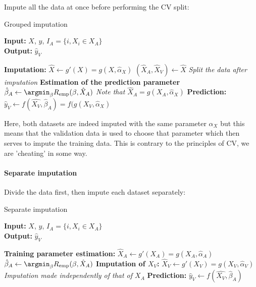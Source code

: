 Impute all the data at once before performing the CV split:
\begin{algorithm}[H]
	\caption{Grouped imputation}
	\hspace*{\algorithmicindent} \textbf{Input:} $X$, $y$, $I_A=\{i, X_i \in X_A\}$ \\
 	\hspace*{\algorithmicindent} \textbf{Output:} $\hat{y}_V$
	\begin{algorithmic}[1]
		\State \textbf{Imputation:}
		\Indstate $\hat{X} \leftarrow g'(X) = g(X, \hat{\alpha}_X)$ 
		\Indstate $(\hat{X}_A, \hat{X}_V) \leftarrow \hat{X}$ \Comment \emph{Split the data after imputation}
		\State \textbf{Estimation of the prediction parameter}
		\Indstate $\hat{\beta}_A \leftarrow \argmin_{\beta} R_{\text{emp}}(\beta,\hat{X}_A)$ \Comment \emph{Note that $\hat{X}_A = g(X_A, \hat{\alpha}_X)$}
		\State \textbf{Prediction:}
		\Indstate $\hat{y}_V \leftarrow f(\hat{X_V}, \hat{\beta}_A) = f(g(X_V, \hat{\alpha}_X)$
	\end{algorithmic}
\end{algorithm}

Here, both datasets are indeed imputed with the same parameter $\alpha_X$ but this means that the validation data is used to choose that parameter which then serves to impute the training data. This is contrary to the principles of CV, we are 'cheating' in some way.

\paragraph{Separate imputation}
Divide the data first, then impute each dataset separately:
\begin{algorithm}[H]
	\caption{Separate imputation}
	\hspace*{\algorithmicindent} \textbf{Input:} $X$, $y$, $I_A=\{i, X_i \in X_A\}$ \\
 	\hspace*{\algorithmicindent} \textbf{Output:} $\hat{y}_V$
	\begin{algorithmic}[1]
		\State \textbf{Training parameter estimation:}
		\Indstate $\hat{X}_A \leftarrow g'(X_A) = g(X_A, \hat{\alpha}_A)$
		\Indstate $\hat{\beta}_A \leftarrow \argmin_{\beta} R_{\text{emp}}(\beta,\hat{X}_A)$
		\State \textbf{Imputation of $X_V$:}
		\Indstate $\hat{X}_V \leftarrow g'(X_V) = g(X_V, \hat{\alpha}_V)$ \Comment \emph{Imputation made independently of that of $X_A$}
		\State \textbf{Prediction:}
		\Indstate $\hat{y}_V \leftarrow f(\hat{X_V}, \hat{\beta}_A)$
	\end{algorithmic}
\end{algorithm}

